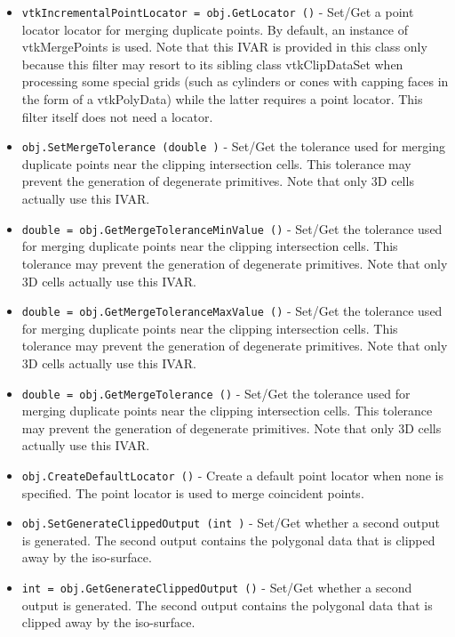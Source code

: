 \begin{itemize}
\item  \verb|vtkIncrementalPointLocator = obj.GetLocator ()| -  Set/Get a point locator locator for merging duplicate points. By default, 
 an instance of vtkMergePoints is used. Note that this IVAR is provided
 in this class only because this filter may resort to its sibling class
 vtkClipDataSet when processing some special grids (such as cylinders or
 cones with capping faces in the form of a vtkPolyData) while the latter
 requires a point locator. This filter itself does not need a locator.

\item  \verb|obj.SetMergeTolerance (double )| -  Set/Get the tolerance used for merging duplicate points near the clipping 
 intersection cells. This tolerance may prevent the generation of degenerate
 primitives. Note that only 3D cells actually use this IVAR.

\item  \verb|double = obj.GetMergeToleranceMinValue ()| -  Set/Get the tolerance used for merging duplicate points near the clipping 
 intersection cells. This tolerance may prevent the generation of degenerate
 primitives. Note that only 3D cells actually use this IVAR.

\item  \verb|double = obj.GetMergeToleranceMaxValue ()| -  Set/Get the tolerance used for merging duplicate points near the clipping 
 intersection cells. This tolerance may prevent the generation of degenerate
 primitives. Note that only 3D cells actually use this IVAR.

\item  \verb|double = obj.GetMergeTolerance ()| -  Set/Get the tolerance used for merging duplicate points near the clipping 
 intersection cells. This tolerance may prevent the generation of degenerate
 primitives. Note that only 3D cells actually use this IVAR.

\item  \verb|obj.CreateDefaultLocator ()| -  Create a default point locator when none is specified. The point locator is
 used to merge coincident points.

\item  \verb|obj.SetGenerateClippedOutput (int )| -  Set/Get whether a second output is generated. The second output contains the
 polygonal data that is clipped away by the iso-surface.

\item  \verb|int = obj.GetGenerateClippedOutput ()| -  Set/Get whether a second output is generated. The second output contains the
 polygonal data that is clipped away by the iso-surface.


\end{itemize}
